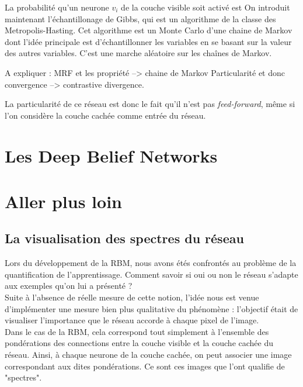 \documentclass[a4paper,twoside]{report}
\begin{document}
                La probabilité qu'un neurone \begin{math}v_{i}\end{math} de la
                couche visible soit activé est 
                On introduit maintenant l'échantillonage de Gibbs, qui est un
                algorithme de la classe des Metropolis-Hasting. Cet algorithme
                est un Monte Carlo d'une chaine de Markov dont l'idée principale
                est d'échantillonner les variables en se basant sur la valeur
                des autres variables. C'est une marche aléatoire sur les chaînes
                de Markov.

                A expliquer : MRF et les propriété --> chaine de Markov
                Particularité et donc convergence --> contrastive divergence.

                La particularité de ce réseau est donc le fait qu'il n'est pas
                \textit{feed-forward}, même si l'on considère la couche cachée comme entrée du
                réseau.


				

        \chapter{Les Deep Belief Networks}



        \chapter{Aller plus loin}

            \section{La visualisation des spectres du réseau}

                Lors du développement de la RBM, nous avons étés confrontés au problème de la quantification de l'apprentissage. Comment savoir si oui ou non le réseau s'adapte aux exemples qu'on lui a présenté ?\\

                Suite à l'absence de réelle mesure de cette notion, l'idée nous est venue d'implémenter une mesure bien plus qualitative du phénomène : l'objectif était de visualiser l'importance que le réseau accorde à chaque pixel de l'image.\\

                Dans le cas de la RBM, cela correspond tout simplement à l'ensemble des pondérations des connections entre la couche visible et la couche cachée du réseau. Ainsi, à chaque neurone de la couche cachée, on peut associer une image correspondant aux dites pondérations. Ce sont ces images que l'ont qualifie de "spectres".
\end{document}
